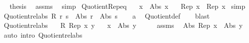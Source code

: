 \begin{isabellebody}
\ \isamarkupfalse%
\ {\isacharquery}{\kern0pt}thesis\ \isamarkupfalse%
\ assms{\isacharparenleft}{\kern0pt}{}{\isacharparenright}{\kern0pt}\ \isamarkupfalse%
\ simp\isanewline
{}\isamarkupfalse%
%
\endisatagproof
{\isafoldproof}%
%
\isadelimproof
\isanewline
%
\endisadelimproof
\isanewline
{}\isamarkupfalse%
\ Quotient{\isacharunderscore}{\kern0pt}Rep{\isacharunderscore}{\kern0pt}eq{\isacharcolon}{\kern0pt}\isanewline
\ \ \ {\isachardoublequoteopen}x{\isacharprime}{\kern0pt}\ {\isasymequiv}\ Abs\ x{\isachardoublequoteclose}\isanewline
\ \ \ {\isachardoublequoteopen}Rep\ x{\isacharprime}{\kern0pt}\ {\isasymequiv}\ Rep\ x{\isacharprime}{\kern0pt}{\isachardoublequoteclose}\isanewline
%
\isadelimproof
%
\endisadelimproof
%
\isatagproof
{}\isamarkupfalse%
\ simp%
\endisatagproof
{\isafoldproof}%
%
\isadelimproof
\isanewline
%
\endisadelimproof
\isanewline
{}\isamarkupfalse%
\ Quotient{\isacharunderscore}{\kern0pt}rel{\isacharunderscore}{\kern0pt}abs{\isacharcolon}{\kern0pt}\ {\isachardoublequoteopen}R\ r\ s\ {\isasymLongrightarrow}\ Abs\ r\ {\isacharequal}{\kern0pt}\ Abs\ s{\isachardoublequoteclose}\isanewline
%
\isadelimproof
\ \ %
\endisadelimproof
%
\isatagproof
{}\isamarkupfalse%
\ a\ \isamarkupfalse%
\ Quotient{\isacharunderscore}{\kern0pt}def\isanewline
\ \ \isamarkupfalse%
\ blast%
\endisatagproof
{\isafoldproof}%
%
\isadelimproof
\isanewline
%
\endisadelimproof
\isanewline
{}\isamarkupfalse%
\ Quotient{\isacharunderscore}{\kern0pt}rel{\isacharunderscore}{\kern0pt}abs{}{\isacharcolon}{\kern0pt}\isanewline
\ \ \ {\isachardoublequoteopen}R\ {\isacharparenleft}{\kern0pt}Rep\ x{\isacharparenright}{\kern0pt}\ y{\isachardoublequoteclose}\isanewline
\ \ \ {\isachardoublequoteopen}x\ {\isacharequal}{\kern0pt}\ Abs\ y{\isachardoublequoteclose}\isanewline
%
\isadelimproof
%
\endisadelimproof
%
\isatagproof
{}\isamarkupfalse%
\ {\isacharminus}{\kern0pt}\isanewline
\ \ \isamarkupfalse%
\ assms\ \isamarkupfalse%
\ {\isachardoublequoteopen}Abs\ {\isacharparenleft}{\kern0pt}Rep\ x{\isacharparenright}{\kern0pt}\ {\isacharequal}{\kern0pt}\ Abs\ y{\isachardoublequoteclose}\ \isamarkupfalse%
\ {\isacharparenleft}{\kern0pt}auto\ intro{\isacharcolon}{\kern0pt}\ Quotient{\isacharunderscore}{\kern0pt}rel{\isacharunderscore}{\kern0pt}abs{\isacharparenright}{\kern0pt}\isanewline

\end{isabellebody}

